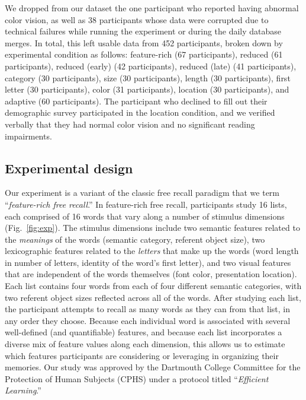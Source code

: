 \documentclass[11pt]{article}
\begin{document}
We dropped from our dataset the one participant who reported having abnormal
color vision, as well as 38 participants whose data were corrupted due to
technical failures while running the experiment or during the daily database
merges. In total, this left usable data from 452 participants, broken down by
experimental condition as follows: feature-rich (67 participants), reduced (61
participants), reduced (early) (42 participants), reduced (late) (41
participants), category (30 participants), size (30 participants), length (30
participants), first letter (30 participants), color (31 participants),
location (30 participants), and adaptive (60 participants). The participant who
declined to fill out their demographic survey participated in the location
condition, and we verified verbally that they had normal color vision and no
significant reading impairments.




\subsection*{Experimental design}

Our experiment is a variant of the classic free recall paradigm that we term
``\textit{feature-rich free recall}.'' In feature-rich free recall,
participants study 16 lists, each comprised of 16 words that vary along a
number of stimulus dimensions (Fig.~\ref{fig:exp}). The stimulus dimensions
include two semantic features related to the \textit{meanings} of the words
(semantic category, referent object size), two lexicographic features related
to the \textit{letters} that make up the words (word length in number of
letters, identity of the word's first letter), and two visual features that are
independent of the words themselves (font color, presentation location). Each
list contains four words from each of four different semantic categories, with
two referent object sizes reflected across all of the words. After studying
each list, the participant attempts to recall as many words as they can from
that list, in any order they choose. Because each individual word is associated
with several well-defined (and quantifiable) features, and because each list
incorporates a diverse mix of feature values along each dimension, this allows
us to estimate which features participants are considering or leveraging in
organizing their memories.  Our study was approved by the Dartmouth College
Committee for the Protection of Human Subjects (CPHS) under a protocol titled
``\textit{Efficient Learning}.''
\end{document}
